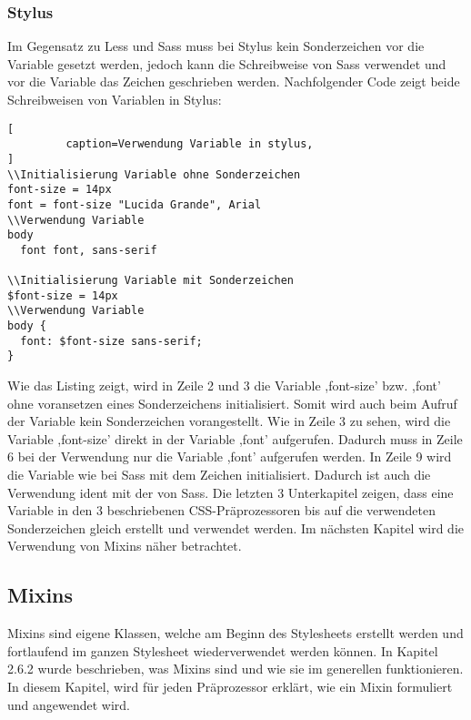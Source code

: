 \subsubsection{Stylus}
Im Gegensatz zu Less und Sass muss bei Stylus kein Sonderzeichen vor die Variable gesetzt werden, jedoch kann die Schreibweise von Sass verwendet und vor die Variable das Zeichen \glqq{\$}\grqq{} geschrieben werden. Nachfolgender Code zeigt beide Schreibweisen von Variablen in Stylus:
\begin{lstlisting}[
         caption=Verwendung Variable in stylus,
]
\\Initialisierung Variable ohne Sonderzeichen
font-size = 14px
font = font-size "Lucida Grande", Arial
\\Verwendung Variable
body
  font font, sans-serif

\\Initialisierung Variable mit Sonderzeichen
$font-size = 14px
\\Verwendung Variable
body {
  font: $font-size sans-serif;
}
\end{lstlisting}
Wie das Listing zeigt, wird in Zeile 2 und 3 die Variable ,font-size' bzw. ,font' ohne voransetzen eines Sonderzeichens initialisiert. Somit wird auch beim Aufruf der Variable kein Sonderzeichen vorangestellt. Wie in Zeile 3 zu sehen, wird die Variable ,font-size' direkt in der Variable ,font' aufgerufen. Dadurch muss in Zeile 6 bei der Verwendung nur die Variable ,font' aufgerufen werden.\newline
In Zeile 9 wird die Variable wie bei Sass mit dem Zeichen \glqq{\$}\grqq{} initialisiert. Dadurch ist auch die Verwendung ident mit der von Sass.\newline\newline
Die letzten 3 Unterkapitel zeigen, dass eine Variable in den 3 beschriebenen CSS-Präprozessoren bis auf die verwendeten Sonderzeichen gleich erstellt und verwendet werden.\newline
Im nächsten Kapitel wird die Verwendung von Mixins näher betrachtet.
\newpage
\subsection{Mixins}
Mixins sind eigene Klassen, welche am Beginn des Stylesheets erstellt werden und fortlaufend im ganzen Stylesheet wiederverwendet werden können. \newline
In Kapitel 2.6.2 wurde beschrieben, was Mixins sind und wie sie im generellen funktionieren. In diesem Kapitel, wird für jeden Präprozessor erklärt, wie ein Mixin formuliert und angewendet wird.
